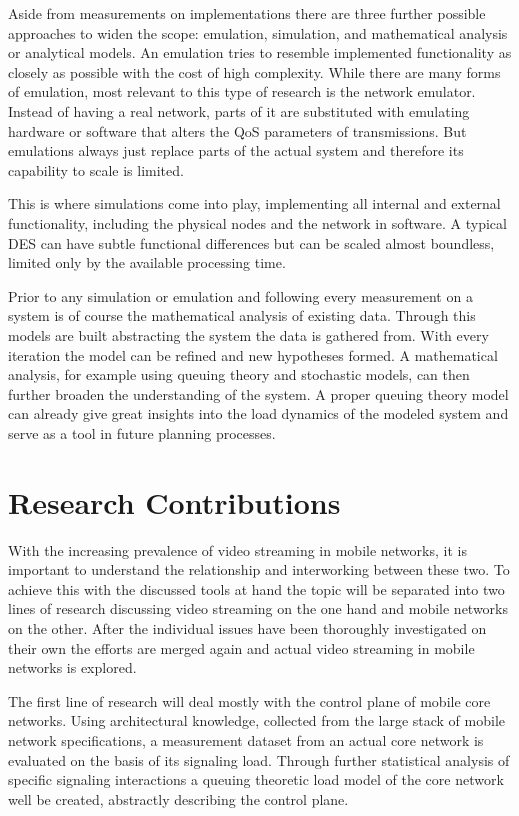 Aside from measurements on implementations there are three further possible approaches to widen the scope: emulation, simulation, and mathematical analysis or analytical models. An emulation tries to resemble implemented functionality as closely as possible with the cost of high complexity. While there are many forms of emulation, most relevant to this type of research is the network emulator. Instead of having a real network, parts of it are substituted with emulating hardware or software that alters the \gls{QoS} parameters of transmissions. But emulations always just replace parts of the actual system and therefore its capability to scale is limited.

This is where simulations come into play, implementing all internal and external functionality, including the physical nodes and the network in software. A typical \gls{DES} can have subtle functional differences but can be scaled almost boundless, limited only by the available processing time. 

Prior to any simulation or emulation and following every measurement on a system is of course the mathematical analysis of existing data. Through this models are built abstracting the system the data is gathered from. With every iteration the model can be refined and new hypotheses formed.
A mathematical analysis, for example using queuing theory and stochastic models, can then further broaden the understanding of the system. A proper queuing theory model can already give great insights into the load dynamics of the modeled system and serve as a tool in future planning processes.


\section{Research Contributions}

With the increasing prevalence of video streaming in mobile networks, it is important to understand the relationship and interworking between these two. To achieve this with the discussed tools at hand the topic will be separated into two lines of research discussing video streaming on the one hand and mobile networks on the other. After the individual issues have been thoroughly investigated on their own the efforts are merged again and actual video streaming in mobile networks is explored.

The first line of research will deal mostly with the control plane of mobile core networks. Using architectural knowledge, collected from the large stack of mobile network specifications, a measurement dataset from an actual core network is evaluated on the basis of its signaling load. Through further statistical analysis of specific signaling interactions a queuing theoretic load model of the core network well be created, abstractly describing the control plane. 


